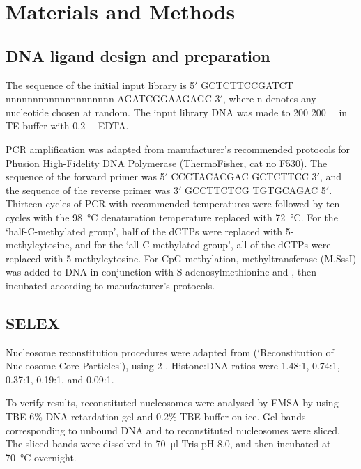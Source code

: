 \documentclass[parskip=full, numbers=noenddot]{scrreprt}
\begin{document}
\section{Materials and Methods}
\label{sec:emsaselex_methods}

\subsection{DNA ligand design and preparation}
\label{ssec:emsaselex_methods_lig}

The sequence of the initial input library is 5$'$ GCTCTTCCGATCT nnnnnnnnnnnnnnnnnnnn AGATCGGAAGAGC 3$'$, where n denotes any nucleotide chosen at random. The input library DNA was made to 200 \SI{200}{\nano\Molar} in TE buffer with \SI{0.2}{\milli\Molar} EDTA.

PCR amplification was adapted from manufacturer's recommended protocols for Phusion High-Fidelity DNA Polymerase (ThermoFisher, cat no F530).  The sequence of the forward primer was 5$'$ CCCTACACGAC GCTCTTCC 3$'$, and the sequence of the reverse primer was 3$'$ GCCTTCTCG TGTGCAGAC 5$'$.  Thirteen cycles of PCR with recommended temperatures were followed by ten cycles with the \SI{98}{\celsius} denaturation temperature replaced with \SI{72}{\celsius}.  For the `half-C-methylated group', half of the dCTPs were replaced with 5-methylcytosine, and for the `all-C-methylated group', all of the dCTPs were replaced with 5-methylcytosine.   For CpG-methylation, methyltransferase (M.SssI) was added to DNA in conjunction with S-adenosylmethionine and , then incubated according to manufacturer's protocols.

\subsection{SELEX}
\label{ssec:emsaselex_methods_selex}

Nucleosome reconstitution procedures were adapted from \citet{dyer_reconstitution_2003} (`Reconstitution of Nucleosome Core Particles'), using \SI{2}{\Molar} .  Histone:DNA ratios were 1.48:1, 0.74:1, 0.37:1, 0.19:1, and 0.09:1. %

To verify results, reconstituted nucleosomes were analysed by EMSA by using TBE 6\% DNA retardation gel and 0.2\% TBE buffer on ice.  Gel bands corresponding to unbound DNA and to reconstituted nucleosomes were sliced.  The sliced bands were dissolved in \SI{70}{\micro\litre} Tris pH 8.0, and then incubated at \SI{70}{\celsius} overnight.
\end{document}
